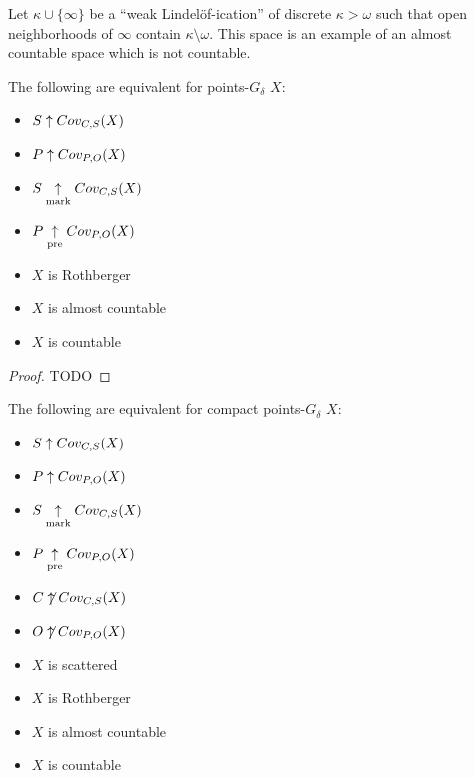 Let $\kappa\cup\{\infty\}$ be a ``weak Lindel\"of-ication'' of
discrete $\kappa>\omega$ such that open neighborhoods of $\infty$ contain
$\kappa\setminus\omega$. This space is an example of an almost countable
space which is not countable.

\begin{thm}
  The following are equivalent for points-$G_\delta$ $X$:
    \begin{itemize}
      \item $S\uparrow Cov_{C,S}(X)$
      \item $P\uparrow Cov_{P,O}(X)$
      \item $S\underset{\text{mark}}{\uparrow}Cov_{C,S}(X)$
      \item $P\underset{\text{pre}}{\uparrow}Cov_{P,O}(X)$
      \item $X$ is Rothberger
      \item $X$ is almost countable
      \item $X$ is countable
    \end{itemize}
\end{thm}

\begin{proof}
  TODO
\end{proof}

\begin{cor}
  The following are equivalent for compact points-$G_\delta$ $X$:
    \begin{itemize}
      \item $S\uparrow Cov_{C,S}(X)$
      \item $P\uparrow Cov_{P,O}(X)$
      \item $S\underset{\text{mark}}{\uparrow}Cov_{C,S}(X)$
      \item $P\underset{\text{pre}}{\uparrow}Cov_{P,O}(X)$
      \item $C\not\uparrow Cov_{C,S}(X)$
      \item $O\not\uparrow Cov_{P,O}(X)$
      \item $X$ is scattered
      \item $X$ is Rothberger
      \item $X$ is almost countable
      \item $X$ is countable
    \end{itemize}
\end{cor}